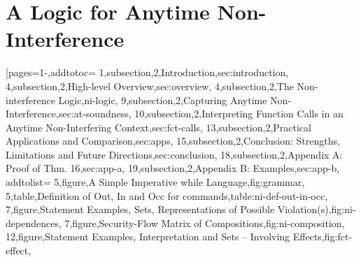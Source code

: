 \section{A Logic for Anytime Non-Interference}\label{sec:anytime}
\pageIconSecurity
{}
[pages={1-},addtotoc={
1,subsection,2,Introduction,sec:introduction,
4,subsection,2,High-level Overview,sec:overview,
4,subsection,2,The Non-interference Logic,ni-logic,
9,subsection,2,Capturing Anytime Non-Interference,sec:at-soundness,
10,subsection,2,Interpreting Function Calls in an Anytime Non-Interfering Context,sec:fct-calls,
13,subsection,2,Practical Applications and Comparison,sec:apps,
15,subsection,2,{Conclusion: Strengths, Limitations and Future Directions},sec:conclusion,
18,subsection,2,{Appendix A: Proof of Thm. 16},sec:app-a,
19,subsection,2,{Appendix B: Examples},sec:app-b},
addtolist={
5,figure,{A Simple Imperative while Language},fig:grammar,
5,table,{Definition of Out, In and Occ for commands},table:ni-def-out-in-occ,
7,figure,{Statement Examples, Sets, Representations of Possible Violation(s)},fig:ni-dependences,
7,figure,{Security-Flow Matrix of Compositions},fig:ni-composition,
12,figure,{Statement Examples, Interpretation and Sets -- Involving Effects},fig:fct-effect},
